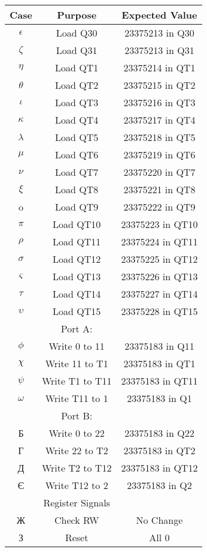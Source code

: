 \documentclass{article}
\begin{document}
\begin{tabular}{ |c|c|c| }
\hline
Case & Purpose & Expected Value \\
\hline
$\epsilon$ & Load Q30 & 23375213 in Q30\\
$\zeta$ & Load Q31 & 23375213 in Q31\\
$\eta$ & Load QT1 & 23375214 in QT1\\
$\theta$ & Load QT2 & 23375215 in QT2\\
$\iota$ & Load QT3 & 23375216 in QT3\\
$\kappa$ & Load QT4 & 23375217 in QT4\\
$\lambda$ & Load QT5 & 23375218 in QT5\\
$\mu$ & Load QT6 & 23375219 in QT6\\
$\nu$ & Load QT7 & 23375220 in QT7\\
$\xi$ & Load QT8 & 23375221 in QT8\\
o & Load QT9 & 23375222 in QT9\\
$\pi$ & Load QT10 & 23375223 in QT10\\
$\rho$ & Load QT11 & 23375224 in QT11\\
$\sigma$ & Load QT12 & 23375225 in QT12\\
$\varsigma$ & Load QT13 & 23375226 in QT13\\
$\tau$ & Load QT14 & 23375227 in QT14\\
$\upsilon$ & Load QT15 & 23375228 in QT15\\
& Port A: & \\
$\phi$ & Write 0 to 11 & 23375183 in Q11 \\
$\chi$ & Write 11 to T1 & 23375183 in QT1 \\
$\psi$ & Write T1 to T11 & 23375183 in QT11 \\
$\omega$ & Write T11 to 1 & 23375183 in Q1 \\
& Port B: & \\
Б & Write 0 to 22 & 23375183 in Q22 \\
Г & Write 22 to T2 & 23375183 in QT2 \\
Д & Write T2 to T12 & 23375183 in QT12 \\
Є & Write T12 to 2 & 23375183 in Q2 \\
& Register Signals & \\
Ж & Check RW & No Change \\
З & Reset & All 0 \\
\hline
\end{tabular}


\newpage
\end{document}
